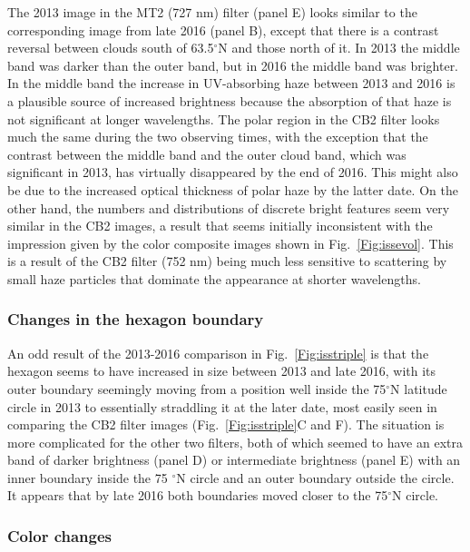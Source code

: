 \documentclass[article,11pt]{emulateapj}
\def\degx{$^\circ$}
\begin{document}
The 2013 image in the MT2 (727 nm) filter (panel E) looks similar to the
corresponding image from late 2016 (panel B), except that there is a contrast reversal between clouds
south of 63.5\degx N and those north of it.  In 2013 the middle band
was darker than the outer band, but in 2016 the middle band was
brighter.  In the middle band the increase in UV-absorbing haze
between 2013 and 2016 is a plausible source of increased brightness
because the absorption of that haze is not significant at longer
wavelengths. The polar region in the CB2 filter looks
much the same during the two observing times, with the exception that
the contrast between the middle band and the outer cloud band, which
was significant in 2013, has virtually disappeared by the end of 2016.
This might also be due to the increased optical thickness of polar
haze by the latter date.  On the other hand, the numbers and
distributions of discrete bright features seem very similar in the CB2
images, a result that seems initially inconsistent with the impression
given by the color composite images shown in Fig.\ \ref{Fig:issevol}.
This is a result of the CB2 filter (752 nm) being much less sensitive to scattering
by small haze particles that dominate the appearance at shorter wavelengths.

\subsubsection{Changes in the hexagon boundary}

An odd result of the 2013-2016 comparison in Fig.\ \ref{Fig:isstriple}
is that the hexagon seems to have increased in size between 2013 and
late 2016, with its outer boundary seemingly moving from a position well inside the 75\degx N latitude
circle in 2013 to essentially straddling it at the later date,
most easily seen in comparing the CB2 filter images (Fig.\ \ref{Fig:isstriple}C and F).
The situation is more complicated for the other two filters, both of which
seemed to have an extra band of darker brightness (panel D) or intermediate brightness
 (panel E) with an inner boundary inside the 75 \degx N circle and an outer
boundary outside the circle. It appears that by late 2016 both boundaries
moved closer to the 75\degx N circle.

\subsubsection{Color changes}
\end{document}
